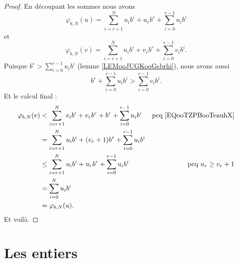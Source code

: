 \begin{proof}
	En découpant les sommes nous avons
	\begin{equation}
		\varphi_{b,N}(u)=\sum_{i=r+1}^Nu_ib^i+u_rb^r+\sum_{i=0}^{r-1}u_ib^i
	\end{equation}
	et
	\begin{equation}
		\varphi_{b,N}(v)=\sum_{i=r+1}^Nu_ib^i+v_rb^r+\sum_{i=0}^{r-1}v_ib^i.
	\end{equation}
	Puisque \( b^r>\sum_{i=0}^{r-1}u_ib^i\) (lemme \ref{LEMooJUGKooGsbrhi}), nous avons aussi
	\begin{equation}        \label{EQooTZPBooTeauhX}
		b^r+\sum_{i=0}^{r-1}u_ib^i>\sum_{i=0}^{r-1}v_ib^i.
	\end{equation}
	Et le calcul final :
	\begin{subequations}
		\begin{align}
			\varphi_{b,N}(v) & <   \sum_{i=r+1}^Nv_ib^i+v_rb^r+b^r+\sum_{i=0}^{r-1}u_ib^i & \text{pcq \eqref{EQooTZPBooTeauhX}} \\
			                 & =   \sum_{i=r+1}^Nu_ib^i+(v_r+1)b^r+\sum_{i=0}^{r-1}u_ib^i                                       \\
			                 & \leq  \sum_{i=r+1}^Nu_ib^i+u_rb^r+\sum_{i=0}^{r-1}u_ib^i   & \text{pcq } u_r\geq v_r+1           \\
			                 & =   \sum_{i=0}^Nu_ib^i                                                                           \\
			                 & =   \varphi_{b,N}(u).
		\end{align}
	\end{subequations}
	Et voilà.
\end{proof}

\section{Les entiers}

